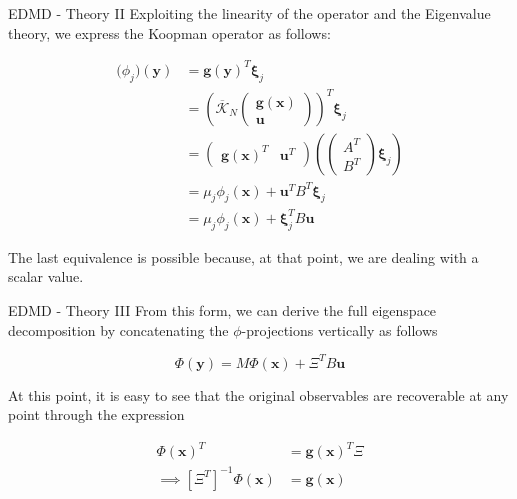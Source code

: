 \documentclass{beamer}
\begin{document}
\begin{frame}{EDMD - Theory II}
    Exploiting the linearity of the operator and the Eigenvalue theory, we express the Koopman operator as follows:
    
    \begin{align*}
        \mathbf(\phi_j)\left(\mathbf{y}\right)
        &=
        \mathbf{g}\left(\mathbf{y}\right)^T \mathbf{\xi}_j \\
        &=
        \left(\overline{\mathcal{K}}_N
        \begin{pmatrix}
            \mathbf{g}\left(\mathbf{x}\right)
            \\
            \mathbf{u}
        \end{pmatrix}\right)^T \mathbf{\xi}_j \\
        &=
        \begin{pmatrix}
            \mathbf{g}\left(\mathbf{x}\right)^T
            &
            \mathbf{u}^T
        \end{pmatrix}
        \left(
            \begin{pmatrix}
                A^T
                \\
                B^T
            \end{pmatrix}
            \mathbf{\xi}_j
        \right) \\
        &=
        \mu_j \phi_j\left(\mathbf{x}\right)
        +
        \mathbf{u}^T B^T \mathbf{\xi}_j \\
        &=
        \mu_j \phi_j\left(\mathbf{x}\right)
        +
        \mathbf{\xi}_j^T B \mathbf{u}
    \end{align*}

    The last equivalence is possible because, at that point, we are dealing with a scalar value. 
\end{frame}

\begin{frame}{EDMD - Theory III}
    From this form, we can derive the full eigenspace decomposition by concatenating the $\phi$-projections vertically as follows

    \begin{equation*}
        \Phi\left(\mathbf{y}\right) = M \Phi\left(\mathbf{x}\right) + \Xi^T B \mathbf{u}
    \end{equation*}

    At this point, it is easy to see that the original observables are recoverable at any point through the expression

    \begin{align*}
        \Phi\left(\mathbf{x}\right)^T &= \mathbf{g}\left(\mathbf{x}\right)^T \Xi \\
        \implies \left[\Xi^T\right]^{-1} \Phi\left(\mathbf{x}\right) &= \mathbf{g}\left(\mathbf{x}\right)
    \end{align*}
\end{frame}
\end{document}
